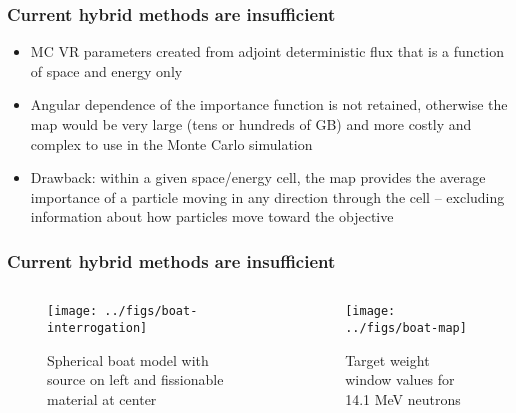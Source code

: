\documentclass[xcolor=x11names,compress]{beamer}
\renewcommand{\(}{\begin{columns}}
\renewcommand{\)}{\end{columns}}
\newcommand{\<}[1]{\begin{column}{#1}}
\renewcommand{\>}{\end{column}}
\begin{document}
\begin{frame}[fragile]
  \frametitle{Current hybrid methods are insufficient}

	\begin{itemize}
	\item MC VR parameters created from adjoint deterministic flux that is a function of space and energy only
	\item Angular dependence of the importance function is not retained, otherwise the map would be very large (tens or hundreds of GB) and more costly and complex to use in the Monte Carlo simulation
	\item Drawback: within a given space/energy cell, the map provides the average importance of a particle moving in any direction through the cell -- excluding information about how particles move toward the objective
	\end{itemize}

\end{frame}

\begin{frame}[fragile]
  \frametitle{Current hybrid methods are insufficient}

	\begin{columns}
  	\begin{column}{0.5\textwidth}
 	 \begin{center}
 	 \begin{figure}
 	 \texttt{[image: ../figs/boat-interrogation]}  
 	 \caption{Spherical boat model with source on left and fissionable material at center}
 	 \end{figure}
 	 \end{center}
  	\end{column}
 	\begin{column}{0.5\textwidth}
 	 \begin{center}
 	 \begin{figure}
 	 \texttt{[image: ../figs/boat-map]}  
 	 \caption{Target weight window values for 14.1 MeV neutrons}
 	 \end{figure}
 	 \end{center}
  	\end{column}
	\end{columns}

\end{frame}
\end{document}
